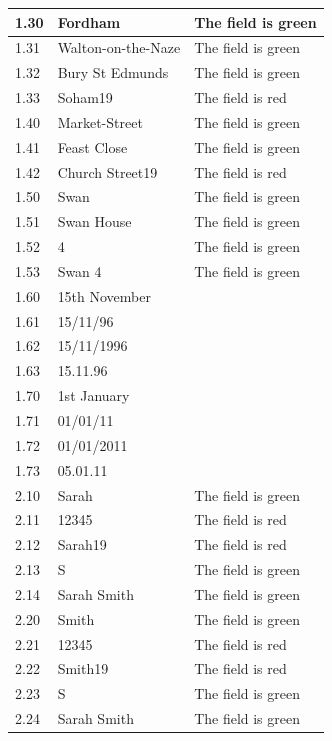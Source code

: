 \begin{landscape}
\begin{center}
\begin{longtable}{|p{2cm}|p{5cm}|p{8cm}|}
        1.30 & Fordham &  The field is green \\ \hline
        1.31 & Walton-on-the-Naze &  The field is green \\ \hline
        1.32 & Bury St Edmunds &  The field is green \\ \hline
        1.33 & Soham19 &  The field is red \\ \hline

        1.40 & Market-Street &  The field is green \\ \hline
        1.41 & Feast Close & The field is green \\ \hline
        1.42 & Church Street19 & The field is red \\ \hline
        
        1.50 & Swan & The field is green \\ \hline
        1.51 & Swan House & The field is green \\ \hline
        1.52 & 4 & The field is green \\ \hline
        1.53 & Swan 4 & The field is green \\ \hline
        
        \rowcolor{darkgrey} 1.60 & 15th November &  \\ \hline
        \rowcolor{darkgrey} 1.61 & 15/11/96 & \\ \hline
        \rowcolor{darkgrey} 1.62 & 15/11/1996 &  \\ \hline
        \rowcolor{darkgrey} 1.63 & 15.11.96 & \\ \hline
        
        \rowcolor{darkgrey} 1.70 & 1st January &  \\ \hline
        \rowcolor{darkgrey} 1.71 & 01/01/11 &  \\ \hline
        \rowcolor{darkgrey} 1.72 & 01/01/2011 &  \\ \hline
        \rowcolor{darkgrey} 1.73 & 05.01.11 & \\ \hline
        
        2.10 & Sarah & The field is green \\ \hline
        2.11 & 12345 & The field is red \\ \hline
        2.12 & Sarah19 & The field is red\\ \hline
        2.13 & S & The field is green\\ \hline
        2.14 & Sarah Smith &  The field is green\\ \hline
        
        2.20 & Smith & The field is green \\ \hline
        2.21 & 12345 & The field is red \\ \hline
        2.22 & Smith19 & The field is red \\ \hline
        2.23 & S & The field is green \\ \hline
        2.24 & Sarah Smith & The field is green \\ \hline
        

\end{longtable}
\end{center}
\end{landscape}
